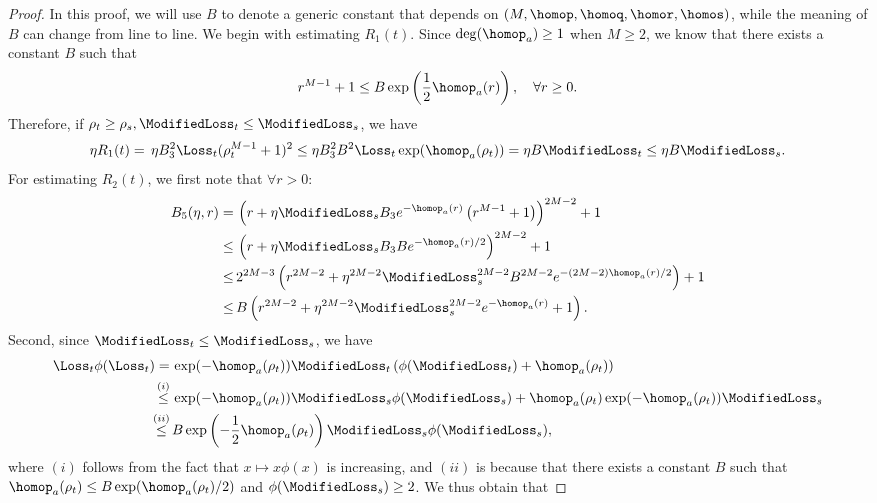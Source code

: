 \begin{proof}
    In this proof, we will use $B$ to denote a generic constant that depends on $(M, \homop, \homoq, \homor, \homos)$, while the meaning of $B$ can change from line to line. We begin with estimating $R_1 (t)$. Since $\deg (\homop_a) \ge 1$ when $M \ge 2$, we know that there exists a constant $B$ such that
    \begin{equation*}
        r^{M - 1} + 1 \le B \exp \left( \frac{1}{2} \homop_a (r) \right), \quad \forall r \ge 0.
    \end{equation*}
    Therefore, if $\rho_t \ge \rho_s, \ModifiedLoss_t \le \ModifiedLoss_s$, we have
    \begin{equation*}
        \eta R_1 (t) = \, \eta B_3^2 \Loss_t (\rho_t^{M - 1} + 1)^2 \le \eta B_3^2 B^2 \Loss_t \exp (\homop_a (\rho_t)) = \eta B \ModifiedLoss_t \le \eta B \ModifiedLoss_s.
    \end{equation*}
    For estimating $R_2 (t)$, we first note that $\forall r > 0$:
    \begin{align*}
        B_5 (\eta, r) = \, & \left( r + \eta \ModifiedLoss_s B_3 e^{-\homop_a(r)} \left( r^{M-1} + 1 \right) \right)^{2M - 2} + 1 \\
        \le \, & \left( r + \eta \ModifiedLoss_s B_3 B e^{-\homop_a(r) / 2} \right)^{2M - 2} + 1 \\
        \le \, & 2^{2M - 3} \left( r^{2 M - 2} + \eta^{2M - 2} \ModifiedLoss_s^{2M - 2} B^{2M - 2} e^{- (2M - 2) \homop_a(r) / 2} \right) + 1 \\
        \le \, & B \left( r^{2 M - 2} + \eta^{2M - 2} \ModifiedLoss_s^{2M - 2} e^{- \homop_a(r)} + 1 \right).
    \end{align*}
    Second, since $\ModifiedLoss_t \le \ModifiedLoss_s$, we have
    \begin{align*}
        \Loss_t \phi(\Loss_t) = \, & \exp(- \homop_a (\rho_t)) \ModifiedLoss_t \left( \phi(\ModifiedLoss_t) + \homop_a (\rho_t) \right) \\
        \stackrel{(i)}{\le} \, & \exp(- \homop_a (\rho_t)) \ModifiedLoss_s  \phi(\ModifiedLoss_s) + \homop_a (\rho_t) \exp(- \homop_a (\rho_t)) \ModifiedLoss_s \\
        \stackrel{(ii)}{\le} \, & B \exp \left(- \frac{1}{2} \homop_a (\rho_t) \right) \ModifiedLoss_s  \phi(\ModifiedLoss_s),
    \end{align*}
    where $(i)$ follows from the fact that $x \mapsto x \phi(x)$ is increasing, and $(ii)$ is because that there exists a constant $B$ such that $\homop_a (\rho_t) \le B \exp(\homop_a (\rho_t) / 2)$ and $\phi(\ModifiedLoss_s) \ge 2$. We thus obtain that

\end{proof}
